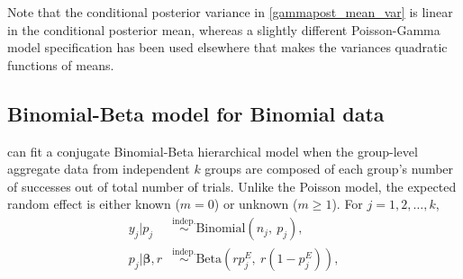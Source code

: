 \documentclass[article]{jss}
\begin{document}
Note that the conditional posterior variance in  \eqref{gammapost_mean_var} is linear in the conditional posterior mean, whereas a slightly different Poisson-Gamma model specification has been used elsewhere \citep{morris1997} that makes the variances  quadratic functions of means.  


\subsection[Binomial-Beta]{Binomial-Beta model for Binomial data}
 can fit a conjugate Binomial-Beta hierarchical model when the group-level aggregate data from independent $k$ groups are composed of each group's number of successes out of total number of trials. Unlike the Poisson model, the expected random effect is either known ($m=0$) or unknown ($m\ge1$). For $j=1, 2, \ldots, k$,
\begin{align}
y_{j} \vert p_{j} &\stackrel{\textrm{indep.}}{\sim} \textrm{Binomial}(n_{j}, ~p_{j}),\\
p_{j} \vert \boldsymbol{\beta}, r &\stackrel{\textrm{indep.}}{\sim} \textrm{Beta}(rp^E_j,~ r(1-p^E_j)),
\end{align}
\end{document}
